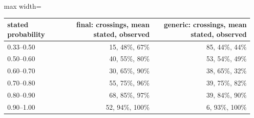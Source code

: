 \begin{adjustbox}{max width=\textwidth}
{\footnotesize
\begin{tabular}{lrr}
\toprule
\textbf{stated probability} & \textbf{final: crossings, mean stated, observed} & \textbf{generic: crossings, mean stated, observed} \\
\midrule
0.33--0.50 & 15, 48\%, 67\% & 85, 44\%, 44\% \\
0.50--0.60 & 40, 55\%, 80\% & 53, 54\%, 49\% \\
0.60--0.70 & 30, 65\%, 90\% & 38, 65\%, 32\% \\
0.70--0.80 & 55, 75\%, 96\% & 39, 75\%, 82\% \\
0.80--0.90 & 68, 85\%, 97\% & 39, 84\%, 90\% \\
0.90--1.00 & 52, 94\%, 100\% & 6, 93\%, 100\% \\
\bottomrule
\end{tabular}
}
\end{adjustbox}

